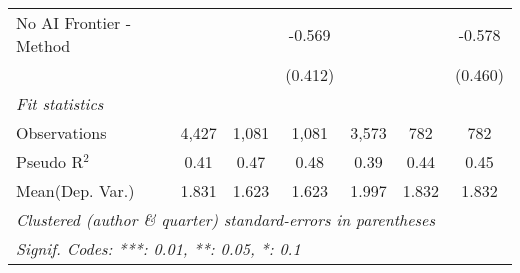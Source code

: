 \begin{tabular}{lcccccc}
   No AI Frontier - Method &               &              & -0.569  &               &            & -0.578\\   
                           &               &              & (0.412) &               &            & (0.460)\\   
   \midrule
   \emph{Fit statistics}\\
   Observations            & 4,427         & 1,081        & 1,081   & 3,573         & 782        & 782\\  
   Pseudo R$^2$            & 0.41          & 0.47         & 0.48    & 0.39          & 0.44       & 0.45\\  
Mean(Dep. Var.) & 1.831 & 1.623 & 1.623 & 1.997 & 1.832 & 1.832 \\
   \midrule \midrule
   \multicolumn{7}{l}{\emph{Clustered (author \& quarter) standard-errors in parentheses}}\\
   \multicolumn{7}{l}{\emph{Signif. Codes: ***: 0.01, **: 0.05, *: 0.1}}\\
\end{tabular}
\par\endgroup
